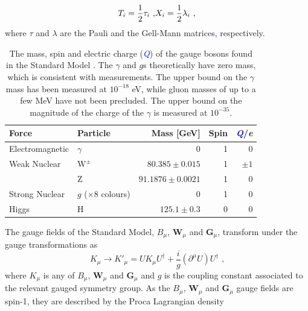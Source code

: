 %
\begin{equation}
T_{i} = \frac{1}{2}\tau_{i} \text{ ,} \\
X_{i} = \frac{1}{2}\lambda_{i} \text{ ,} \\
\end{equation}
%
\noindent where $\tau$ and $\lambda$ are the Pauli and the Gell-Mann matrices\textcolor{blue}{,} respectively.  
%
\begin{table}[h!]
\centering
\begin{tabular}{l l r r r}
\hline
Force & Particle & Mass [GeV] & Spin & \textcolor{blue}{\textit{Q}}/\textit{e} \\
\hline
Electromagnetic & $\gamma$ & 0 & 1 & 0 \\
\hline
Weak Nuclear & $\text{W}^{\pm}$ & $80.385 \pm 0.015$ & 1 & $\pm1$ \\
& Z & $91.1876 \pm 0.0021$ & 1 & 0 \\
\hline
Strong Nuclear & $g$ ($\times 8$ colours) & 0 & 1 & 0 \\
\hline
Higgs & H & $125.1 \pm 0.3$ & 0 & 0 \\
\end{tabular}
\caption[The mass, spin and electric charge (\textcolor{blue}{\textit{Q}}) of the gauge bosons found in the Standard Model \cite{Beringer:1900zz}.  The $\gamma$ and $g$s theoretically have zero mass, which is consistent with measurements.  The upper bound on the $\gamma$ mass has been measured at $10^{-18}$ eV, while gluon masses of up to a few MeV have not been precluded.  The upper bound on the magnitude of the charge of the $\gamma$ is measured at $10^{-35}$.]{The mass, spin and electric charge (\textcolor{blue}{\textit{Q}}) of the gauge bosons found in the Standard Model \cite{Beringer:1900zz}.  The $\gamma$ and $g$s theoretically have zero mass, which is consistent with measurements.  The upper bound on the $\gamma$ mass has been measured at $10^{-18}$ eV, while gluon masses of up to a few MeV have not been precluded.  The upper bound on the magnitude of the charge of the $\gamma$ is measured at $10^{-35}$.}
\label{table:smbosons}
\end{table}
%
The gauge fields of the Standard Model, $B_{\mu}$, $\textbf{W}_{\mu}$ and $\textbf{G}_{\mu}$, transform under the gauge transformations as
%
\begin{equation}
K_{\mu} \rightarrow K'_{\mu} = UK_{\mu}U^{\dagger} + \frac{i}{g}(\partial^{\mu}U)U^{\dagger} \text{ ,} 
\end{equation}
%
\noindent where $K_{\mu}$ is any of $B_{\mu}$, $\textbf{W}_{\mu}$ and $\textbf{G}_{\mu}$ and $g$ is the coupling constant associated to the relevant gauged symmetry group.  As the $B_{\mu}$, $\textbf{W}_{\mu}$ and $\textbf{G}_{\mu}$ gauge fields are spin-1, they are described by the Proca Lagrangian density

